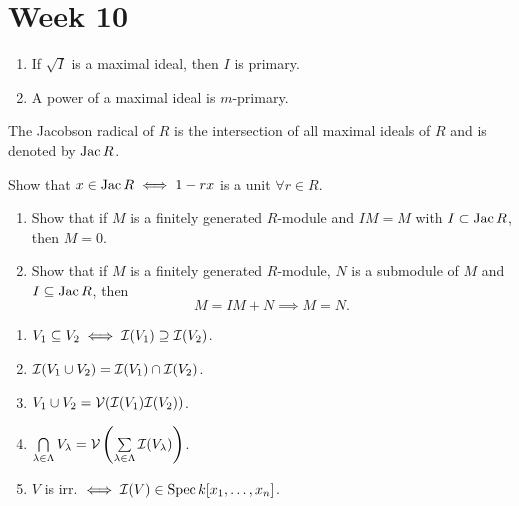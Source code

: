 
\section{Week 10}

\begin{exercise} \mbox{}
  \begin{enumerate}
    \item If $\sqrt{I}$ is a maximal ideal, then $I$ is primary.
    \item A power of a maximal ideal is $m$-primary.
  \end{enumerate}
\end{exercise}

\begin{exercise}
  \begin{definition}
    The Jacobson radical of $R$ is the intersection of all maximal ideals
    of $R$ and is denoted by $\operatorname{Jac} R$.
  \end{definition}
  Show that $x \in \operatorname{Jac} R \iff 1 - rx$ is a unit $\forall r \in R$.
\end{exercise}

\begin{exercise} \mbox{}
  \begin{enumerate}
    \item Show that if $M$ is a finitely generated $R$-module and $IM = M$
      with $I \subset \operatorname{Jac}  R$, then $M = 0$.
    \item Show that if $M$ is a finitely generated $R$-module, $N$ is a
      submodule of $M$ and $I\subseteq \operatorname{Jac} R$, then
      \[ M = IM + N \implies M = N. \]
  \end{enumerate}
\end{exercise}

\begin{exercise} \mbox{}
  \begin{enumerate}
    \item $V_1 \subseteq V_2 \iff \mathcal{I}(V_1) \supseteq \mathcal{I}(V_2)$.
    \item $\mathcal{I}(V_1 \cup V_2) = \mathcal{I}(V_1) \cap \mathcal{I}(V_2)$.
    \item $V_1 \cup V_2 = \mathcal{V}(\mathcal{I}(V_1) \mathcal{I}(V_2))$.
    \item $\bigcap\limits_{\lambda \in \Lambda} V_\lambda =
      \mathcal{V}\left(\sum\limits_{\lambda \in \Lambda} \mathcal{I}(V_\lambda)\right)$.
    \item $V$ is irr. $\iff \mathcal{I}(V) \in \operatorname{Spec} k[x_1, \dots, x_n]$.
  \end{enumerate}
\end{exercise}

